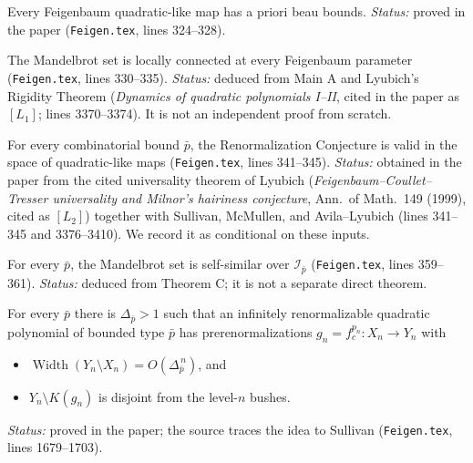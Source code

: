 \begin{theorem}[Main A]
\label{thm:dl-fei-A}
Every Feigenbaum quadratic-like map has a priori beau bounds.  \emph{Status:} proved in the paper
(\texttt{Feigen.tex}, lines 324--328).
\end{theorem}

\begin{theorem}[Main B]
\label{thm:dl-fei-B}
The Mandelbrot set is locally connected at every Feigenbaum parameter (\texttt{Feigen.tex}, lines 330--335).
\emph{Status:} deduced from Main A and Lyubich's Rigidity Theorem (\emph{Dynamics of quadratic polynomials I--II}, cited
in the paper as $[L_1]$; lines 3370--3374).  It is not an independent proof from scratch.
\end{theorem}

\begin{theorem}
\label{thm:dl-fei-C}
For every combinatorial bound $\bar p$, the Renormalization Conjecture is valid in the space of quadratic-like
maps (\texttt{Feigen.tex}, lines 341--345).  \emph{Status:} obtained in the paper from the cited universality theorem
of Lyubich (\emph{Feigenbaum--Coullet--Tresser universality and Milnor's hairiness conjecture}, Ann.\ of Math.\ 149
(1999), cited as $[L_2]$) together with Sullivan, McMullen, and Avila--Lyubich (lines 341--345 and 3376--3410).  We
record it as conditional on these inputs.
\end{theorem}

\begin{theorem}
\label{thm:dl-fei-D}
For every $\bar p$, the Mandelbrot set is self-similar over $\mathcal I_{\bar p}$ (\texttt{Feigen.tex}, lines 359--361).
\emph{Status:} deduced from Theorem C; it is not a separate direct theorem.
\end{theorem}

\begin{proposition}
\label{prop:dl-fei-teich}
For every $\bar p$ there is $\Delta_{\bar p}>1$ such that an infinitely renormalizable quadratic polynomial of bounded
type $\bar p$ has prerenormalizations $g_n=f_c^{p_n}\colon X_n\to Y_n$ with
\begin{itemize}
\item[(I)] $\operatorname{Width}(Y_n\setminus X_n)=O(\Delta_{\bar p}^{\,n})$, and
\item[(II)] $Y_n\setminus K(g_n)$ is disjoint from the level-$n$ bushes.
\end{itemize}
\emph{Status:} proved in the paper; the source traces the idea to Sullivan (\texttt{Feigen.tex}, lines 1679--1703).
\end{proposition}

